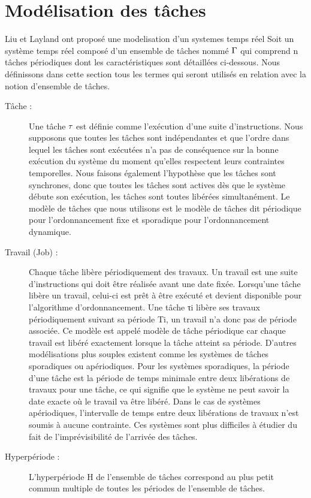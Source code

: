 \section{Modélisation des tâches}
\vspace{-1cm}
Liu et Layland \cite{LL73} ont proposé une modelisation d'un systemes temps réel 
Soit un système temps réel composé d’un ensemble de tâches nommé $\Gamma$ qui comprend n tâches périodiques dont les caractéristiques sont détaillées ci-dessous. Nous définissons dans cette section tous les termes qui seront utilisés en relation avec la notion d’ensemble de tâches.
\begin{description}
\item[Tâche :] Une tâche $\tau_{}$ est définie comme l’exécution d’une suite d’instructions. Nous supposons que toutes les tâches sont indépendantes et que l’ordre dans lequel les tâches sont exécutées n’a pas de conséquence sur la bonne exécution du système du moment qu’elles respectent leurs contraintes temporelles. Nous faisons également l’hypothèse que les tâches sont synchrones, donc que toutes les tâches sont actives dès que le système débute son exécution, les tâches sont toutes libérées simultanément. Le modèle de tâches que nous utilisons est le modèle de tâches dit périodique pour l’ordonnancement fixe et sporadique pour l’ordonnancement dynamique.
\item[Travail (Job) :] Chaque tâche libère périodiquement des travaux. Un travail est une suite d’instructions qui doit être réalisée avant une date fixée. Lorsqu’une tâche libère un travail, celui-ci est prêt à être exécuté et devient disponible pour l’algorithme d’ordonnancement. Une tâche τi libère ses travaux périodiquement suivant sa période Ti, un travail n’a donc pas de période associée. Ce modèle est appelé modèle de tâche périodique car chaque travail est libéré exactement lorsque la tâche atteint sa période. D’autres modélisations plus souples existent comme les systèmes de tâches sporadiques ou apériodiques. Pour les systèmes sporadiques, la période d’une tâche est la période de temps minimale entre deux libérations de travaux pour une tâche, ce qui signifie que le système ne peut savoir la date exacte où le travail va être libéré. Dans le cas de systèmes apériodiques, l’intervalle de temps entre deux libérations de travaux n’est soumis à aucune contrainte. Ces systèmes sont plus diﬃciles à étudier du fait de l’imprévisibilité de l’arrivée des tâches. 
\item[Hyperpériode :] L’hyperpériode H de l’ensemble de tâches correspond au plus petit commun multiple de toutes les périodes de l’ensemble de tâches.

\end{description}
